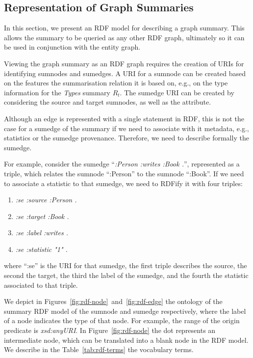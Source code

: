 \subsection{Representation of Graph Summaries}
\label{chap03:summary-rdf}

In this section, we present an RDF model for describing a graph summary. This allows the summary to be queried as any other RDF graph, ultimately so it can be used in conjunction with the entity graph.

Viewing the graph summary as an RDF graph requires the creation of URIs for identifying sumnodes and sumedges. A URI for a sumnode can be created based on the features the summarisation relation it is based on, e.g., on the type information for the \emph{Types} summary $R_t$. The sumedge URI can be created by considering the source and target sumnodes, as well as the attribute.

\begin{remark}
	Although an edge is represented with a single statement in RDF, this is not the case for a sumedge of the summary if we need to associate with it metadata, e.g., statistics or the sumedge provenance. Therefore, we need to describe formally the sumedge.

	For example, consider the sumedge ``\emph{:Person :writes :Book .}'', represented as a triple, which relates the sumnode ``:Person'' to the sumnode ``:Book''. If we need to associate a statistic to that sumedge, we need to RDFify it with four triples:
	\begin{enumerate}
		\item \emph{:se :source :Person .}
		\item \emph{:se :target :Book .}
		\item \emph{:se :label :writes .}
		\item \emph{:se :statistic "1" .}
	\end{enumerate}
	where ``:se'' is the URI for that sumedge, the first triple describes the source, the second the target, the third the label of the sumedge, and the fourth the statistic associated to that triple.
\end{remark}

We depict in Figures~\ref{fig:rdf-node}~and~\ref{fig:rdf-edge} the ontology of the summary RDF model of the sumnode and sumedge respectively, where the label of a node indicates the type of that node. For example, the range of the origin predicate is \emph{xsd:anyURI}. In Figure~\ref{fig:rdf-node} the dot represents an intermediate node, which can be translated into a blank node in the RDF model. We describe in the Table~\ref{tab:rdf-terms} the vocabulary terms.\\

